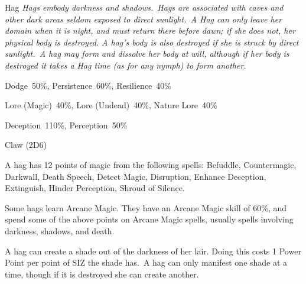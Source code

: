 \begin{monsterbox}{Hag}
	\textit{Hags embody darkness and shadows. Hags are associated with caves and other dark areas seldom exposed to direct sunlight. A Hag can only leave her domain when it is night, and must return there before dawn; if she does not, her physical body is destroyed. A hag’s body is also destroyed if she is struck by direct sunlight. A hag may form and dissolve her body at will, although if her body is destroyed it takes a Hag time (as for any nymph) to form another.}\\
	\rpghline
	\basics[%
        hitpoints  = 11, 
	majorwound = 6,
	damagemodifier = +1D6,
	powerpoints = 22,
	movementrate = 15m,
	armor = None,
	plunderrating = 3
	]
	\rpghline%
	\stats[ %
		STR = 6D6    (21),
		CON = 3D6    (11),
		DEX = 3D6    (11),
		SIZ = 3D6    (11),
		INT = 2D6+12 (19),
		POW = 2D6+21 (28),
		CHA = 1D6    (3)
	]
	\rpghline%
	\begin{rpg-monsteraction}[Resistances]
		Dodge~50\%, Persistence~60\%, Resilience~40\%
	\end{rpg-monsteraction}
	\begin{rpg-monsteraction}[Knowledge]
		Lore (Magic)~40\%, Lore (Undead)~40\%, Nature Lore~40\%
	\end{rpg-monsteraction}
	\begin{rpg-monsteraction}[Practical]
		Deception~110\%, Perception~50\%
	\end{rpg-monsteraction}
	\begin{rpg-monsteraction}
		Claw (2D6)
	\end{rpg-monsteraction}
	\begin{rpg-monsteraction}[Magic 75\%]
		A hag has 12 points of magic from the following spells: Befuddle, Countermagic, Darkwall, Death Speech, Detect Magic, Disruption, Enhance Deception, Extinguish, Hinder Perception, Shroud of Silence.
	\end{rpg-monsteraction}
	\begin{rpg-monsteraction}
		Some hags learn Arcane Magic. They have an Arcane Magic skill of 60\%, and spend some of the above points on Arcane Magic spells, usually spells involving darkness, shadows, and death.
	\end{rpg-monsteraction}
	\begin{rpg-monsteraction}
		A hag can create a shade out of the darkness of her lair. Doing this costs 1 Power Point per point of SIZ the shade has. A hag can only manifest one shade at a time, though if it is destroyed she can create another.
	\end{rpg-monsteraction}

\end{monsterbox}

